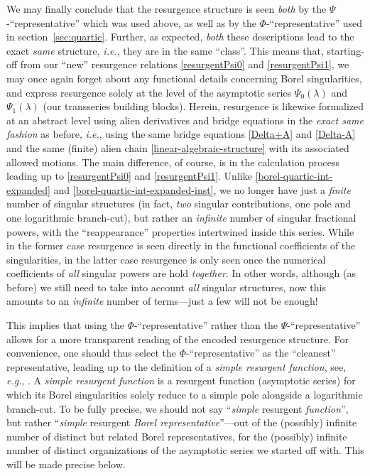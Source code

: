 \documentclass[11pt,a4paper]{article}
\begin{document}
We may finally conclude that the resurgence structure is seen \textit{both} by the $\Psi$-``representative'' which was used above, as well as by the $\Phi$-``representative'' used in section~\ref{sec:quartic}. Further, as expected, \textit{both} these descriptions lead to the exact \textit{same} structure, \textit{i.e.}, they are in the same ``class''. This means that, starting-off from our ``new'' resurgence relations \eqref{resurgentPsi0} and \eqref{resurgentPsi1}, we may once again forget about any functional details concerning Borel singularities, and express resurgence solely at the level of the asymptotic series $\Psi_0 (\lambda)$ and $\Psi_1 (\lambda)$ (our transseries building blocks). Herein, resurgence is likewise formalized at an abstract level using alien derivatives and bridge equations in the \textit{exact same fashion} as before, \textit{i.e.}, using the same bridge equations \eqref{Delta+A} and \eqref{Delta-A} and the same (finite) alien chain \eqref{linear-algebraic-structure} with its associated allowed motions. The main difference, of course, is in the calculation process leading up to \eqref{resurgentPsi0} and \eqref{resurgentPsi1}. Unlike \eqref{borel-quartic-int-expanded} and \eqref{borel-quartic-int-expanded-inst}, we no longer have just a \textit{finite} number of singular structures (in fact, \textit{two} singular contributions, one pole and one logarithmic branch-cut), but rather an \textit{infinite} number of singular fractional powers, with the ``reappearance'' properties intertwined inside this series. While in the former case resurgence is seen directly in the functional coefficients of the singularities, in the latter case resurgence is only seen once the numerical coefficients of \textit{all} singular powers are hold \textit{together}. In other words, although (as before) we still need to take into account \textit{all} singular structures, now this amounts to an \textit{infinite} number of terms---just a few will not be enough!

This implies that using the $\Phi$-``representative'' rather than the $\Psi$-``representative'' allows for a more transparent reading of the encoded resurgence structure. For convenience, one should thus select the $\Phi$-``representative'' as the ``cleanest'' representative, leading up to the definition of a \textit{simple resurgent function}, see, \textit{e.g.}, \cite{e81, cnp93a, cnp93b, ss03}. A \textit{simple resurgent function} is a resurgent function (asymptotic series) for which its Borel singularities solely reduce to a simple pole alongside a logarithmic branch-cut. To be fully precise, we should not say ``\textit{simple} resurgent \textit{function}'', but rather ``\textit{simple} resurgent \textit{Borel representative}''---out of the (possibly) infinite number of distinct but related Borel representatives, for the (possibly) infinite number of distinct organizations of the asymptotic series we started off with. This will be made precise below.
\end{document}
